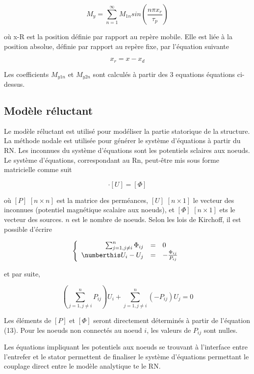 \begin{equation}
    M_y = \sum_{n=1}^\infty M_{1n}sin(\frac{n\pi x_r}{\tau_p})
\end{equation}

où x-R est la position définie par rapport au repère mobile. Elle est liée à la position absolue, définie par rapport au repère fixe, par l'équation suivante

\begin{equation}
    x_r=x-x_d
\end{equation}

Les coefficients $M_{y1n}$ et $M_{y2n}$ sont calculés à partir des 3 equations équations ci-dessus.
\newpage
\subsection{Modèle réluctant}
Le modèle réluctant est utilisé pour modéliser la partie statorique de la structure. La méthode nodale est utilisée pour générer le système d'équations à partir du RN. Les inconnues du système d'équations sont les potentiels sclaires aux noeuds. Le système d'équations, correspondant au Rn, peut-être mis sous forme matricielle comme suit 

\begin{equation}
    [P]\cdot[U]=[\Phi]
\end{equation}

où $[P]$ $[n\times n]$ est la matrice des perméances, $[U]$ $[n\times1]$ le vecteur des inconnues (potentiel magnétique scalaire aux noeuds), et $[\Phi]$ $[n\times1]$ ets le vecteur des sources. $n$ est le nombre de noeuds. Selon les lois de Kirchoff, il est possible d'écrire

\[
\left\{
\begin{array}{r c l}
\sum_{j=1,j\neq i}^n\Phi_{ij}&=&0\\ \numberthis
U_i-U_j &=& -\frac{\Phi_{ij}}{P_{ij}}
\end{array}
\right.
\]

et par suite,

\begin{equation}
    \label{nm}
    \left(\sum_{j=1,j\neq i}^nP_{ij}\right)U_i+\sum_{j=1,j\neq i}^n(-P_{ij})U_j = 0
\end{equation}

Les éléments de $[P]$ et $[\Phi]$ seront directement déterminés à partir de l'équation (13). Pour les noeuds non connectés au noeud $i$, les valeurs de $P_{ij}$ sont nulles.

Les équations impliquant les potentiels aux noeuds se trouvant à l'interface entre l'entrefer et le stator permettent de finaliser le système d'équations permettant le couplage direct entre le modèle analytique te le RN.



